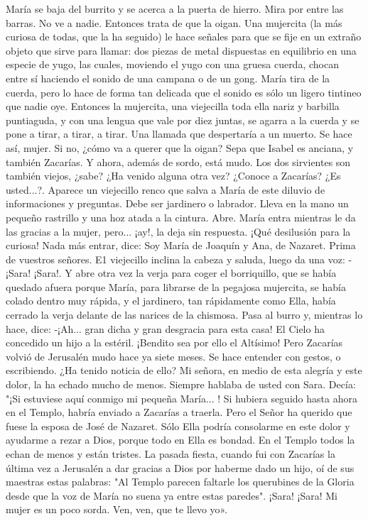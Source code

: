 \documentclass[12pt]{book} %
\begin{document}
María se baja del burrito y se acerca a la puerta de hierro. Mira por entre las barras. No ve a nadie. Entonces trata de 
que la oigan. Una mujercita (la más curiosa de todas, que la ha seguido) le hace señales para que se fije en un extraño objeto que sirve para llamar: dos piezas de metal dispuestas en equilibrio en una especie de yugo, las cuales, moviendo el yugo con una gruesa cuerda, chocan entre sí haciendo el sonido de una campana o de un gong. 
María tira de la cuerda, pero lo hace de forma tan delicada que el sonido es sólo un ligero tintineo que nadie oye. Entonces la mujercita, una viejecilla toda ella nariz y barbilla puntiaguda, y con una lengua que vale por diez juntas, se agarra a la cuerda y se pone a tirar, a tirar, a tirar. Una llamada que despertaría a un muerto. 
Se hace así, mujer. Si no, ¿cómo va a querer que la oigan? Sepa que Isabel es anciana, y también Zacarías. Y ahora, además de sordo, está mudo. Los dos sirvientes son también viejos, ¿sabe? ¿Ha venido alguna otra vez? ¿Conoce a Zacarías? ¿Es usted...?. 
Aparece un viejecillo renco que salva a María de este diluvio de informaciones y preguntas. Debe ser jardinero o 
labrador. Lleva en la mano un pequeño rastrillo y una hoz atada a la cintura. Abre. María entra mientras le da las gracias a la mujer, pero... ¡ay!, la deja sin respuesta. ¡Qué desilusión para la curiosa! 
Nada más entrar, dice: 
Soy María de Joaquín y Ana, de Nazaret. Prima de vuestros señores. E1 viejecillo inclina la cabeza y saluda, luego da una voz: -¡Sara! ¡Sara!. 
Y abre otra vez la verja para coger el borriquillo, que se había quedado afuera porque María, para librarse de la 
pegajosa mujercita, se había colado dentro muy rápida, y el jardinero, tan rápidamente como Ella, había cerrado la verja delante de las narices de la chismosa. Pasa al burro y, mientras lo hace, dice: 
-¡Ah... gran dicha y gran desgracia para esta casa! El Cielo ha concedido un hijo a la estéril. ¡Bendito sea por ello el Altísimo! Pero Zacarías volvió de Jerusalén mudo hace ya siete meses. Se hace entender con gestos, o escribiendo. ¿Ha tenido noticia de ello? Mi señora, en medio de esta alegría y este dolor, la ha echado mucho de menos. Siempre hablaba de usted con Sara. Decía: "¡Si estuviese aquí conmigo mi pequeña 
María... ! Si hubiera seguido hasta ahora en el Templo, habría enviado a Zacarías a traerla. Pero el Señor ha querido que fuese la esposa de José de Nazaret. Sólo Ella podría consolarme en este dolor y ayudarme a rezar a Dios, porque todo en Ella es bondad. En el Templo todos la echan de menos y están tristes. La pasada fiesta, cuando fui con Zacarías la última vez a Jerusalén a dar gracias a Dios por haberme dado un hijo, oí de sus maestras estas palabras: "Al Templo parecen faltarle los querubines de la Gloria desde que la voz de María no suena ya entre estas paredes". ¡Sara! ¡Sara! Mi mujer es un poco sorda. Ven, ven, que te llevo yo». 
\end{document}
